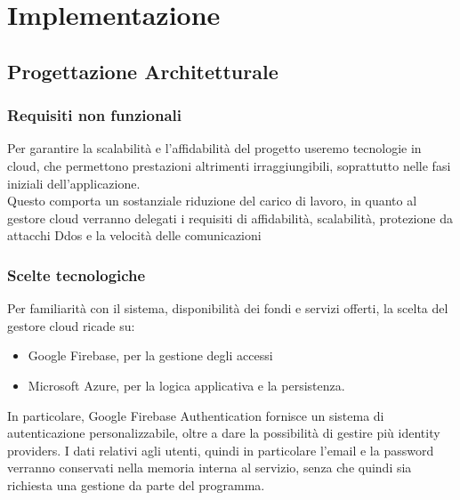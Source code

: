 \clearpage
\section{Implementazione}

\subsection{Progettazione Architetturale}

\subsubsection{Requisiti non funzionali}
Per garantire la scalabilità e l'affidabilità del progetto useremo tecnologie in cloud,
 che permettono prestazioni altrimenti irraggiungibili, soprattutto nelle fasi iniziali dell'applicazione.\\
Questo comporta un sostanziale riduzione del carico di lavoro, in quanto al gestore cloud verranno delegati i requisiti di 
affidabilità, scalabilità, protezione da attacchi Ddos e la velocità delle comunicazioni\\ 
\subsubsection{Scelte tecnologiche}

Per familiarità con il sistema, disponibilità dei fondi e servizi offerti, 
la scelta del gestore cloud ricade su:
\begin{itemize}
    \item Google Firebase, per la gestione degli accessi
    \item Microsoft Azure, per la logica applicativa e la persistenza.
\end{itemize}
In particolare, Google Firebase Authentication fornisce un sistema di autenticazione personalizzabile, 
oltre a dare la possibilità di gestire più identity providers. 
I dati relativi agli utenti, quindi in particolare l'email e la password verranno conservati nella memoria interna al servizio, senza che quindi sia richiesta una gestione da parte del programma.\\

